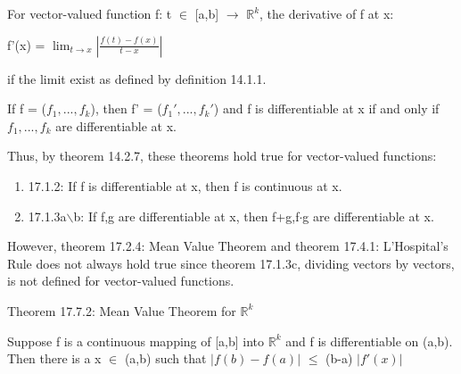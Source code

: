     \begin{adjustbox}{minipage=14cm, right, vspace=0.1cm 0cm}
        For vector-valued function f: t $\in$ [a,b] $\rightarrow$ $\mathbb{R}^k$,
        the derivative of f at x:

        \hspace{1cm}
        f'(x) = $\lim_{t \rightarrow x} |\frac{f(t)-f(x)}{t-x}|$

        if the limit exist as defined by {\color{blue} definition 14.1.1}.

        \vspace{0.2cm}

        If f = ($f_1, ... , f_k$), then f' = ($f_1', ... , f_k'$)
        and f is differentiable at x if and only if $f_1, ... , f_k$ are
        differentiable at x.

        \vspace{0.1cm}

        Thus, by {\color{red} theorem 14.2.7}, these theorems hold true
        for vector-valued functions:

        \begin{enumerate}[label=-, leftmargin=0.7cm, itemsep=0.1cm]
            \item {\color{red} 17.1.2}:
                If f is differentiable at x, then f is continuous at x.
            
            \item {\color{red} 17.1.3a$\backslash$b}:
                If f,g are differentiable at x, then f+g,f$\cdot$g
                are differentiable at x. 
        \end{enumerate}

        \vspace{0.1cm}

        However, {\color{red} theorem 17.2.4: Mean Value Theorem}
        and {\color{red} theorem 17.4.1: L'Hospital's Rule}
        does not always hold true since {\color{red} theorem 17.1.3c},
        dividing vectors by vectors, is not defined for vector-valued functions.
    \end{adjustbox}

    \vspace{0.5cm}

{ \color{red} Theorem 17.7.2: Mean Value Theorem for $\mathbb{R}^k$ }

    \begin{adjustbox}{minipage=14cm, right, vspace=0.1cm 0cm}
        Suppose f is a continuous mapping of [a,b] into $\mathbb{R}^k$
        and f is differentiable on (a,b). Then there is a x $\in$ (a,b)
        such that $|f(b) - f(a)|$ $\leq$ (b-a) $|f'(x)|$
    \end{adjustbox}


